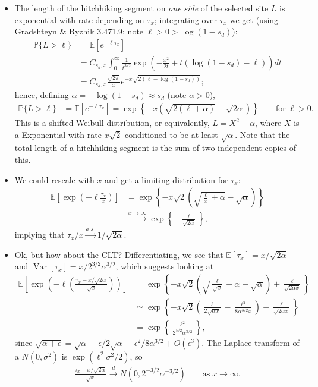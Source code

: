 \documentclass{article}
\newcommand{\E}{\mathbb{E}}
\renewcommand{\P}{\mathbb{P}}
\newcommand{\var}{\mathop{\mbox{Var}}}
\begin{document}
\begin{itemize}
\item The length of the hitchhiking segment on \emph{one side} of the selected site $L$ is exponential with rate depending on $\tau_x$;
integrating over $\tau_x$ we get
(using Gradshteyn \& Ryzhik 3.471.9; note $\ell > 0 > \log(1-s_d)$):
\begin{align}
 \P\{ L > \ell \} &= \E\left[ e^{-\ell \tau_x} \right] \\
 & = C_{s_d,x} \int_0^\infty \frac{1}{t^{3/2}} \exp\left(-\frac{x^2}{2t} + t(\log(1-s_d) -\ell) \right)  dt \\
 &= C_{s_d,x} \frac{\sqrt{2\pi}}{x} e^{-x\sqrt{2(\ell-\log(1-s_d))}} ; \label{eqn:first_integral}
\end{align}
hence, defining $\alpha = - \log(1-s_d) \approx s_d$ (note $\alpha>0$),
\begin{align}
 \P\{ L > \ell \} &= \E\left[ e^{-\ell \tau_x} \right] = \exp\left\{{-x\left(\sqrt{2(\ell+\alpha)} - \sqrt{2\alpha}\right)}\right\} \qquad \mbox{for}\; \ell>0.
\end{align}
This is a shifted Weibull distribution, or equivalently, $L=X^2-\alpha$, where $X$ is a Exponential with rate $x\sqrt{2}$ conditioned to be at least $\sqrt{\alpha}$.
Note that the total length of a hitchhiking segment is the sum of two independent copies of this.

\item We could rescale with $x$ and get a limiting distribution for $\tau_x$:
\begin{align}
  \E\left[\exp\left( -\ell \frac{\tau_x}{x} \right)\right]
        &= \exp\left\{ - x\sqrt{2}\left(\sqrt{\frac{\ell}{x}+\alpha} - \sqrt{\alpha}\right) \right\} \\
        &\xrightarrow{x\to\infty} \exp\left\{ - \frac{\ell}{\sqrt{2\alpha}} \right\} ,
\end{align}
implying that $\tau_x/x \xrightarrow{a.s.} 1/\sqrt{2\alpha}$.

\item Ok, but how about the CLT?  Differentiating, we see that $\E[\tau_x]=x/\sqrt{2\alpha}$ and $\var[\tau_x]=x/2^{3/2}\alpha^{3/2}$,
which suggests looking at
\begin{align}
\E\left[\exp\left( -\ell \left(\frac{\tau_x-x/\sqrt{2\alpha}}{\sqrt{x}} \right) \right)\right]
    &= \exp\left\{ - x\sqrt{2}\left(\sqrt{\frac{\ell}{\sqrt{x}}+\alpha} - \sqrt{\alpha}\right) + \frac{\ell}{\sqrt{2\alpha x}} \right\} \\
    &\simeq \exp\left\{ - x\sqrt{2}\left( \frac{\ell}{2\sqrt{\alpha x}} - \frac{\ell^2}{8\alpha^{3/2}x}  \right) + \frac{\ell}{\sqrt{2\alpha x}} \right\} \\
    &= \exp\left\{ \frac{\ell^2}{2^{5/2}\alpha^{3/2}} \right\} ,
\end{align}
since $\sqrt{\alpha+\epsilon}=\sqrt{\alpha} +\epsilon/2\sqrt{\alpha}-\epsilon^2/8\alpha^{3/2} + O(\epsilon^3)$.
The Laplace transform of a $N(0,\sigma^2)$ is $\exp(\ell^2\sigma^2/2)$, so
\begin{align}
\frac{\tau_x - x/\sqrt{2\alpha}}{\sqrt{x}} \xrightarrow{d} N(0,2^{-3/2}\alpha^{-3/2}) \qquad \mbox{as}\;x\to\infty.
\end{align}


\end{itemize}
\end{document}
